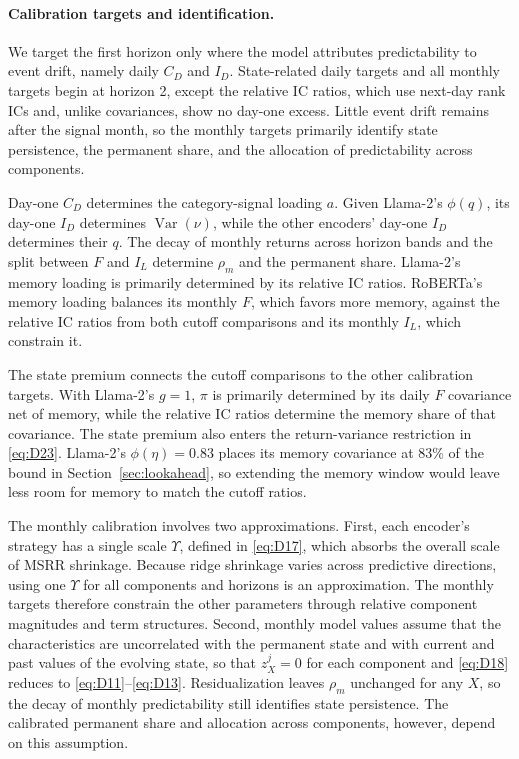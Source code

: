 \documentclass[11pt,letterpaper]{article}
\theoremstyle{remark}
\DeclareMathOperator{\Var}{Var}
\begin{document}
\paragraph{Calibration targets and identification.}
We target the first horizon only where the model attributes predictability to event drift, namely daily $C_D$ and $I_D$. State-related daily targets and all monthly targets begin at horizon 2, except the relative IC ratios, which use next-day rank ICs and, unlike covariances, show no day-one excess. Little event drift remains after the signal month, so the monthly targets primarily identify state persistence, the permanent share, and the allocation of predictability across components.



Day-one $C_D$ determines the category-signal loading $a$. Given Llama-2's $\phi(q)$, its day-one $I_D$ determines $\Var(\nu)$, while the other encoders' day-one $I_D$ determines their $q$. The decay of monthly returns across horizon bands and the split between $F$ and $I_L$ determine $\rho_m$ and the permanent share. Llama-2's memory loading is primarily determined by its relative IC ratios. RoBERTa's memory loading balances its monthly $F$, which favors more memory, against the relative IC ratios from both cutoff comparisons and its monthly $I_L$, which constrain it.

The state premium connects the cutoff comparisons to the other calibration targets. With Llama-2's $g=1$, $\pi$ is primarily determined by its daily $F$ covariance net of memory, while the relative IC ratios determine the memory share of that covariance. The state premium also enters the return-variance restriction in \eqref{eq:D23}. Llama-2's $\phi(\eta)=0.83$ places its memory covariance at 83\% of the bound in Section~\ref{sec:lookahead}, so extending the memory window would leave less room for memory to match the cutoff ratios.

The monthly calibration involves two approximations. First, each encoder's strategy has a single scale $\Upsilon$, defined in \eqref{eq:D17}, which absorbs the overall scale of MSRR shrinkage. Because ridge shrinkage varies across predictive directions, using one $\Upsilon$ for all components and horizons is an approximation. The monthly targets therefore constrain the other parameters through relative component magnitudes and term structures. Second, monthly model values assume that the characteristics are uncorrelated with the permanent state and with current and past values of the evolving state, so that $z_X^j=0$ for each component and \eqref{eq:D18} reduces to \eqref{eq:D11}--\eqref{eq:D13}. Residualization leaves $\rho_m$ unchanged for any $X$, so the decay of monthly predictability still identifies state persistence. The calibrated permanent share and allocation across components, however, depend on this assumption.
\end{document}
